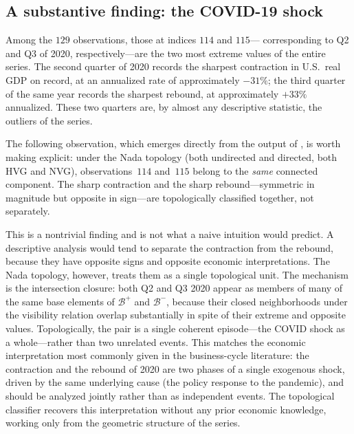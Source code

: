 \documentclass[11pt,a4paper]{article}
\theoremstyle{plain}
\theoremstyle{definition}
\newcommand{\base}{\mathcal{B}}
\begin{document}
\subsection{A substantive finding: the COVID-19 shock}%
\label{subsec:covid-finding}

Among the $129$ observations, those at indices $114$ and $115$---%
corresponding to Q2 and Q3 of 2020, respectively---are the two most
extreme values of the entire series. The second quarter of 2020
records the sharpest contraction in U.S.\ real GDP on record, at an
annualized rate of approximately $-31\%$; the third quarter of the
same year records the sharpest rebound, at approximately $+33\%$
annualized. These two quarters are, by almost any descriptive
statistic, the outliers of the series.

The following observation, which emerges directly from the output of
, is worth making explicit: under
the Nada topology (both undirected and directed, both HVG and NVG),
observations~$114$ and~$115$ belong to the \emph{same} connected
component. The sharp contraction and the sharp rebound---symmetric in
magnitude but opposite in sign---are topologically classified together,
not separately.

This is a nontrivial finding and is not what a naive intuition would
predict. A descriptive analysis would tend to separate the contraction
from the rebound, because they have opposite signs and opposite economic
interpretations. The Nada topology, however, treats them as a single
topological unit. The mechanism is the intersection closure: both Q2 and
Q3 2020 appear as members of many of the same base elements of
$\base^{+}$ and $\base^{-}$, because their closed neighborhoods under
the visibility relation overlap substantially in spite of their extreme
and opposite values. Topologically, the pair is a single coherent
episode---the COVID shock as a whole---rather than two unrelated events.
This matches the economic interpretation most commonly given in the
business-cycle literature: the contraction and the rebound of 2020 are
two phases of a single exogenous shock, driven by the same underlying
cause (the policy response to the pandemic), and should be analyzed
jointly rather than as independent events. The topological classifier
recovers this interpretation without any prior economic knowledge,
working only from the geometric structure of the series.
\end{document}
